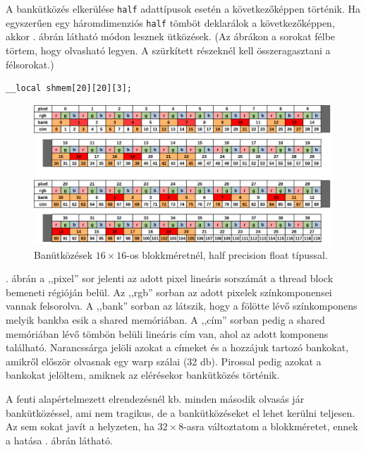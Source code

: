 		A bankütközés elkerülése \verb|half| adattípusok esetén a következőképpen történik. Ha egyszerűen egy háromdimenziós \verb|half| tömböt deklarálok a következőképpen, akkor . ábrán látható módon lesznek ütközések. (Az ábrákon a sorokat félbe törtem, hogy olvasható legyen. A szürkített részeknél kell összeragasztani a félsorokat.)
		\begin{lstlisting}
__local shmem[20][20][3];\end{lstlisting}
		
		\begin{figure}[h]
			\centering
			\includegraphics[width=\textwidth]{kep/gpu_bank_collision_f16_16.png}
			\caption{Banütközések $16\times16$-os blokkméretnél, half precision float típussal.}
			\label{fig:gpu_bank_collision_f16_16}
		\end{figure}
		. ábrán a ,,pixel'' sor jelenti az adott pixel lineáris sorszámát a thread block bemeneti régióján belül. Az ,,rgb'' sorban az adott pixelek színkomponensei vannak felsorolva. A ,,bank'' sorban az látszik, hogy a fölötte lévő színkomponens melyik bankba esik a shared memóriában. A ,,cím'' sorban pedig a shared memóriában lévő tömbön belüli lineáris cím van, ahol az adott komponens található. Narancssárga jelöli azokat a címeket és a hozzájuk tartozó bankokat, amikről először olvasnak egy warp szálai (32 db). Pirossal pedig azokat a bankokat jelöltem, amiknek az elérésekor bankütközés történik.
		
		A fenti alapértelmezett elrendezésnél kb. minden második olvasás jár bankütközéssel, ami nem tragikus, de a bankütközéseket el lehet kerülni teljesen. Az sem sokat javít a helyzeten, ha $32\times8$-asra változtatom a blokkméretet, ennek a hatása . ábrán látható.
		
